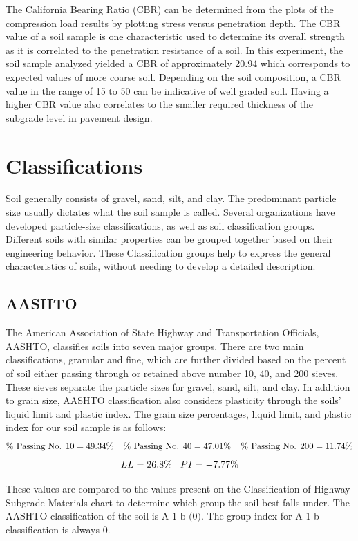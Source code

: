 \documentclass{article}
\begin{document}
\par The California Bearing Ratio (CBR) can be determined from the plots of the compression load results by plotting stress versus penetration depth. The CBR value of a soil sample is one characteristic used to determine its overall strength as it is correlated to the penetration resistance of a soil. In this experiment, the soil sample analyzed yielded a CBR of approximately 20.94 which corresponds to expected values of more coarse soil. Depending on the soil composition, a CBR value in the range of 15 to 50 can be indicative of well graded soil. Having a higher CBR value also correlates to the smaller required thickness of the subgrade level in pavement design. 
\newpage
\section{Classifications}
\par Soil generally consists of gravel, sand, silt, and clay. The predominant particle size usually dictates what the soil sample is called. Several organizations have developed particle-size classifications, as well as soil classification groups. Different soils with similar properties can be grouped together based on their engineering behavior. These Classification groups help to express the general characteristics of soils, without needing to develop a detailed description.  
\subsection{AASHTO}
\par The American Association of State Highway and Transportation Officials, AASHTO, classifies soils into seven major groups. There are two main classifications, granular and fine, which are further divided based on the percent of soil either passing through or retained above number 10, 40, and 200 sieves. These sieves separate the particle sizes for gravel, sand, silt, and clay. In addition to grain size, AASHTO classification also considers plasticity through the soils' liquid limit and plastic index. The grain size percentages, liquid limit, and plastic index for our soil sample is as follows:  
\[\% \text{ Passing No. 10}=49.34\%\hspace{4mm}\% \text{ Passing No. 40}=47.01\%\hspace{4mm}\% \text{ Passing No. 200}=11.74\%\]
\[LL=26.8\%\hspace{3mm}PI=-7.77\%\] 

\par These values are compared to the values present on the Classification of Highway Subgrade Materials chart to determine which group the soil best falls under. The AASHTO classification of the soil is $\boxed{\text{A-1-b (0)}}$. The group index for A-1-b classification is always 0. 
\end{document}
